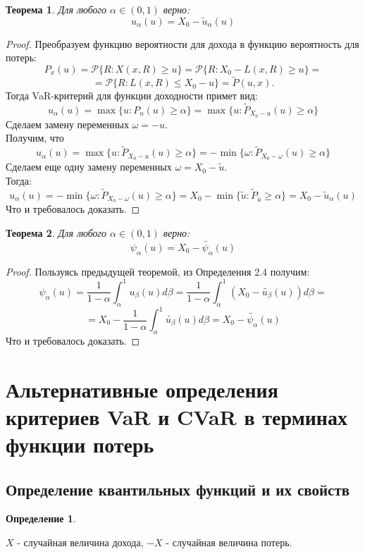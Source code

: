 \documentclass[18pt,a4paper]{article}
\theoremstyle{plain}
\newtheorem{Th}{Теорема}[section]
\theoremstyle{definition}
\newtheorem{Def}{Определение}[section]
\begin{document}
\begin{Th} \label{main} Для любого $\alpha \in (0,1)$ верно:
$$
u_\alpha(u) = X_0 - \tilde{u}_\alpha(u)
$$
\end{Th}

\begin{proof}
Преобразуем функцию вероятности для дохода в функцию вероятность для потерь:
$$
P_x(u) =  \mathcal{P}\{R:X(x,R) \ge u\} =\mathcal{P}\{R:X_0 - L(x,R) \ge u \} =
$$
$$
= \mathcal{P}\{R:L(x,R) \le X_0 - u\} = \tilde{P}(u,x) .
$$
Тогда VaR-критерий для функции доходности примет вид:
$$
u_\alpha(u) = \max\{u:P_u(u)\ge \alpha  \} = \max\{u:\tilde{P}_{X_0-u}(u) \ge \alpha \}
$$
Сделаем замену переменных $\omega = - u$.\\
Получим, что
$$
u_\alpha(u) = \max\{u:\tilde{P}_{X_0-u}(u) \ge \alpha \} = - \min\{\omega:\tilde{P}_{X_0-\omega}(u) \ge \alpha  \}
$$
Сделаем еще одну замену переменных $\omega = X_0 - \tilde{u}$.\\
Тогда:
$$
u_\alpha(u) = - \min\{\omega:\tilde{P}_{X_0-\omega}(u) \ge \alpha  \} = X_0 - \min\{\tilde{u}:\tilde{P}_{\tilde{u}}\ge \alpha\} = X_0 - \tilde{u}_\alpha(u)
$$
Что и требовалось доказать.
\end{proof}
\vspace{2pc}
\begin{Th} \label{main} Для любого $\alpha \in (0,1)$ верно:
$$
\psi_\alpha(u) = X_0 - \tilde{\psi_\alpha}(u)
$$
\end{Th}

\begin{proof}
Пользуясь предыдущей теоремой, из Определения 2.4 получим:
$$
\psi_\alpha(u) =\frac{1}{1-\alpha}\int_\alpha^1 u_\beta(u)d\beta =\frac{1}{1-\alpha}\int_\alpha^1(X_0- \tilde{u_\beta}(u))d\beta=
$$
$$
=X_0 - \frac{1}{1-\alpha}\int_\alpha^1\tilde{u_\beta}(u)d\beta=X_0 - \tilde{\psi_\alpha}(u)
$$
Что и требовалось доказать.
\end{proof}


\centering\section{Альтернативные определения критериев VaR и CVaR в терминах функции потерь}

\centering\subsection{Определение квантильных функций и их свойств}
\flushleft


\begin{Def} \label{main}

$X$ - случайная величина дохода, $-X$ - случайная величина потерь.\\
\end{Def}
\end{document}
